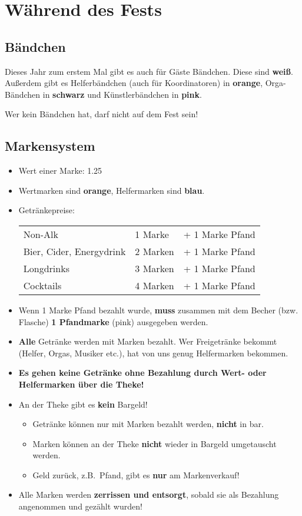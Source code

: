 \section{Während des Fests}
\subsection{Bändchen}
Dieses Jahr zum erstem Mal gibt es auch für Gäste Bändchen. Diese sind \textbf{weiß}. Außerdem gibt es Helferbändchen (auch für Koordinatoren) in \textbf{orange}, Orga-Bändchen in \textbf{schwarz} und Künstlerbändchen in \textbf{pink}.

Wer kein Bändchen hat, darf nicht auf dem Fest sein!
\subsection{Markensystem}
\begin{itemize}
    \item Wert einer Marke: {\large\SI{1.25}{\EUR}}
    \item Wertmarken sind \textbf{orange}, Helfermarken sind \textbf{blau}.
    \item Getränkepreise:

        \begin{tabular}{lll}
            Non-Alk & 1 Marke & + 1 Marke Pfand \\
            Bier, Cider, Energydrink & 2 Marken & + 1 Marke Pfand \\
            Longdrinks & 3 Marken & + 1 Marke Pfand \\
            Cocktails & 4 Marken & + 1 Marke Pfand
        \end{tabular}
    \item Wenn 1 Marke Pfand bezahlt wurde, \textbf{muss} zusammen mit dem Becher (bzw. Flasche) \textbf{1 Pfandmarke} (pink) ausgegeben werden.
    \item \textbf{Alle} Getränke werden mit Marken bezahlt. Wer Freigetränke bekommt (Helfer, Orgas, Musiker etc.), hat von uns genug Helfermarken bekommen.
    \item \textbf{Es gehen keine Getränke ohne Bezahlung durch Wert- oder Helfermarken über die Theke!}
    \item An der Theke gibt es \textbf{kein} Bargeld!
        \begin{itemize}
            \item Getränke können nur mit Marken bezahlt werden, \textbf{nicht} in bar.
            \item Marken können an der Theke \textbf{nicht} wieder in Bargeld umgetauscht werden.
            \item Geld zurück, z.B.\ Pfand, gibt es \textbf{nur} am Markenverkauf!
        \end{itemize}
    \item Alle Marken werden \textbf{zerrissen und entsorgt}, sobald sie als Bezahlung angenommen und gezählt wurden!
\end{itemize}

